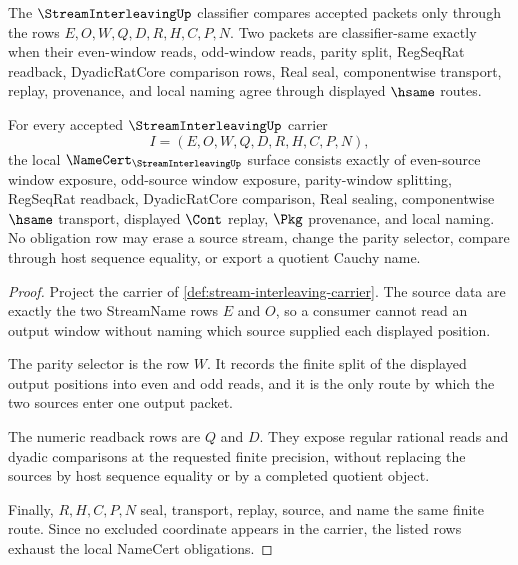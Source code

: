 \begin{definition}
\label{def:stream-interleaving-classifier}
The $\StreamInterleavingUp$ classifier compares accepted packets only through the rows $E,O,W,Q,D,R,H,C,P,N$. Two packets are classifier-same exactly when their even-window reads, odd-window reads, parity split, RegSeqRat readback, DyadicRatCore comparison rows, Real seal, componentwise transport, replay, provenance, and local naming agree through displayed $\hsame$ routes.
\end{definition}

\begin{theorem}
\label{thm:stream-interleaving-namecert-obligations}
For every accepted $\StreamInterleavingUp$ carrier
$$
I=(E,O,W,Q,D,R,H,C,P,N),
$$
the local $\NameCert_{\StreamInterleavingUp}$ surface consists exactly of even-source window exposure, odd-source window exposure, parity-window splitting, RegSeqRat readback, DyadicRatCore comparison, Real sealing, componentwise $\hsame$ transport, displayed $\Cont$ replay, $\Pkg$ provenance, and local naming. No obligation row may erase a source stream, change the parity selector, compare through host sequence equality, or export a quotient Cauchy name.
\end{theorem}
\begin{proof}
Project the carrier of \autoref{def:stream-interleaving-carrier}. The source data are exactly the two StreamName rows $E$ and $O$, so a consumer cannot read an output window without naming which source supplied each displayed position.

The parity selector is the row $W$. It records the finite split of the displayed output positions into even and odd reads, and it is the only route by which the two sources enter one output packet.

The numeric readback rows are $Q$ and $D$. They expose regular rational reads and dyadic comparisons at the requested finite precision, without replacing the sources by host sequence equality or by a completed quotient object.

Finally, $R,H,C,P,N$ seal, transport, replay, source, and name the same finite route. Since no excluded coordinate appears in the carrier, the listed rows exhaust the local NameCert obligations.
\end{proof}

